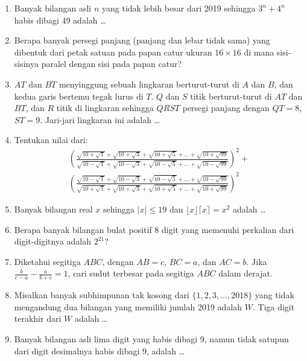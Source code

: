 \documentclass[12pt]{scrartcl}
\begin{document}
\begin{enumerate}
    \item Banyak bilangan asli $n$ yang tidak lebih besar dari 2019 sehingga $3^n+4^n$ habis dibagi 49 adalah \dots
    
    \item Berapa banyak persegi panjang (panjang dan lebar tidak sama) yang dibentuk dari petak satuan pada papan catur ukuran $16 \times 16$ di mana sisi-sisinya paralel dengan sisi pada papan catur?
    
    \item $AT$ dan $BT$ menyinggung sebuah lingkaran berturut-turut di $A$ dan $B$, dan kedua garis bertemu tegak lurus di $T$. $Q$ dan $S$ titik berturut-turut di $AT$ dan $BT$, dan $R$ titik di lingkaran sehingga $QRST$ persegi panjang dengan $QT=8$, $ST=9$. Jari-jari lingkaran ini adalah \dots
    
    \item Tentukan nilai dari:
    \begin{align*}
    \left(\frac{\sqrt{10+\sqrt{1}}+\sqrt{10+\sqrt{3}}+\sqrt{10+\sqrt{5}}+\dots+\sqrt{10+\sqrt{99}}}{\sqrt{10-\sqrt{1}}+\sqrt{10-\sqrt{3}}+\sqrt{10-\sqrt{5}}+\dots+\sqrt{10-\sqrt{99}}}\right)^2 +\\ \left(\frac{\sqrt{10-\sqrt{1}}+\sqrt{10-\sqrt{3}}+\sqrt{10-\sqrt{5}}+\dots+\sqrt{10-\sqrt{99}}}{\sqrt{10+\sqrt{1}}+\sqrt{10+\sqrt{3}}+\sqrt{10+\sqrt{5}}+\dots+\sqrt{10+\sqrt{99}}}\right)^2 
    \end{align*}
    
    \item Banyak bilangan real $x$ sehingga $|x| \le 19$ dan $\lfloor x \rfloor \lceil x \rceil = x^2$ adalah \dots
    
    \item Berapa banyak bilangan bulat positif 8 digit yang memenuhi perkalian dari digit-digitnya adalah $2^{21}$?
    
    \item Diketahui segitiga $ABC$, dengan $AB=c$, $BC=a$, dan $AC=b$. Jika $\frac{b}{c-a}-\frac{a}{b+c}=1$, cari sudut terbesar pada segitiga $ABC$ dalam derajat.
    
    \item Misalkan banyak subhimpunan tak kosong dari $\{1, 2, 3, \dots, 2018\}$ yang tidak mengandung dua bilangan yang memiliki jumlah 2019 adalah $W$. Tiga digit terakhir dari $W$ adalah \dots
    
    \item Banyak bilangan asli lima digit yang habis dibagi 9, namun tidak satupun dari digit desimalnya habis dibagi 9, adalah \dots
    

\end{enumerate}
\end{document}
